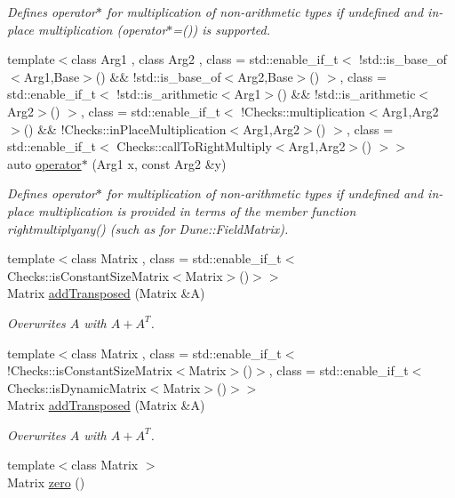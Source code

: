 \begin{DoxyCompactItemize}
\begin{DoxyCompactList}\small\item\em Defines operator$\ast$ for multiplication of non-\/arithmetic types if undefined and in-\/place multiplication (operator$\ast$=()) is supported. \end{DoxyCompactList}\item 
\hypertarget{namespaceRFFGen_a5a5346beba60bcf5a97585baa6d62e72}{{\footnotesize template$<$class Arg1 , class Arg2 , class  = std\-::enable\-\_\-if\-\_\-t$<$ !std\-::is\-\_\-base\-\_\-of$<$\-Arg1,\-Base$>$() \&\& !std\-::is\-\_\-base\-\_\-of$<$\-Arg2,\-Base$>$() $>$, class  = std\-::enable\-\_\-if\-\_\-t$<$ !std\-::is\-\_\-arithmetic$<$\-Arg1$>$() \&\& !std\-::is\-\_\-arithmetic$<$\-Arg2$>$() $>$, class  = std\-::enable\-\_\-if\-\_\-t$<$ !\-Checks\-::multiplication$<$\-Arg1,\-Arg2$>$() \&\&                                       !\-Checks\-::in\-Place\-Multiplication$<$\-Arg1,\-Arg2$>$() $>$, class  = std\-::enable\-\_\-if\-\_\-t$<$ Checks\-::call\-To\-Right\-Multiply$<$\-Arg1,\-Arg2$>$() $>$$>$ }\\auto \hyperlink{namespaceRFFGen_a5a5346beba60bcf5a97585baa6d62e72}{operator$\ast$} (Arg1 x, const Arg2 \&y)}\label{namespaceRFFGen_a5a5346beba60bcf5a97585baa6d62e72}

\begin{DoxyCompactList}\small\item\em Defines operator$\ast$ for multiplication of non-\/arithmetic types if undefined and in-\/place multiplication is provided in terms of the member function rightmultiplyany() (such as for Dune\-::\-Field\-Matrix). \end{DoxyCompactList}\item 
{\footnotesize template$<$class Matrix , class  = std\-::enable\-\_\-if\-\_\-t$<$\-Checks\-::is\-Constant\-Size\-Matrix$<$\-Matrix$>$()$>$$>$ }\\Matrix \hyperlink{namespaceRFFGen_aa35cec985ea0b25a40ada14189fba44d}{add\-Transposed} (Matrix \&A)
\begin{DoxyCompactList}\small\item\em Overwrites $A$ with $A+A^T$. \end{DoxyCompactList}\item 
{\footnotesize template$<$class Matrix , class  = std\-::enable\-\_\-if\-\_\-t$<$!\-Checks\-::is\-Constant\-Size\-Matrix$<$\-Matrix$>$()$>$, class  = std\-::enable\-\_\-if\-\_\-t$<$\-Checks\-::is\-Dynamic\-Matrix$<$\-Matrix$>$()$>$$>$ }\\Matrix \hyperlink{namespaceRFFGen_adef418735161dcbe64af19269329865e}{add\-Transposed} (Matrix \&A)
\begin{DoxyCompactList}\small\item\em Overwrites $A$ with $A+A^T$. \end{DoxyCompactList}\item 
{\footnotesize template$<$class Matrix $>$ }\\Matrix \hyperlink{namespaceRFFGen_a1248d7bf9320b86381dae791086c1f38}{zero} ()
\end{DoxyCompactItemize}


